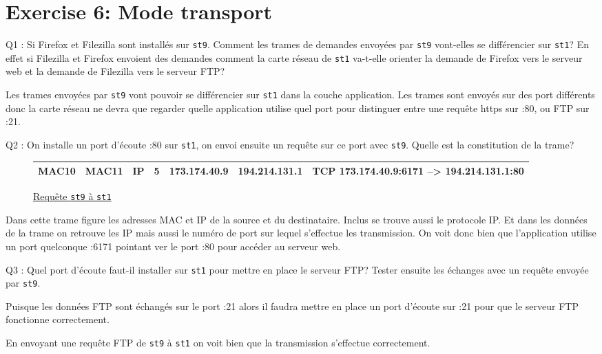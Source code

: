 \documentclass[11pt, openright]{book}
\begin{document}
\section{Exercise 6: Mode transport}

\begin{dent}{Q1 :} Si Firefox et Filezilla sont installés sur \texttt{st9}. Comment les trames de demandes envoyées par \texttt{st9} vont-elles se différencier sur \texttt{st1}? En effet si Filezilla et Firefox envoient des demandes comment la carte réseau de \texttt{st1} va-t-elle orienter la demande de Firefox vers le serveur web et la demande de Filezilla vers le serveur FTP?
	
	Les trames envoyées par \texttt{st9} vont pouvoir se différencier sur \texttt{st1} dans la couche application. Les trames sont envoyés sur des port différents donc la carte réseau ne devra que regarder quelle application utilise quel port pour distinguer entre une requête https sur :80, ou FTP sur :21. 
	
\end{dent}

\begin{dent}{Q2 :} On installe un port d'écoute :80 sur \texttt{st1}, on envoi ensuite un requête sur ce port avec \texttt{st9}. Quelle est la constitution de la trame?
	
	\begin{figure}[ht!]
		\centering
		\begin{tabular}{|c|c|c|c|l|l|l}
			\hline
			MAC10 & MAC11 & IP & 5 & 173.174.40.9 & 194.214.131.1 & TCP 173.174.40.9:6171 --> 194.214.131.1:80 \\
			\hline
		\end{tabular}
		\caption{\ul{Requête \texttt{st9} à \texttt{st1}}}
	\end{figure}
	
	Dans cette trame figure les adresses MAC et IP de la source et du destinataire. Inclus se trouve aussi le protocole IP. Et dans les données de la trame on retrouve les IP mais aussi le numéro de port sur lequel s'effectue les transmission. On voit donc bien que l'application utilise un port quelconque :6171 pointant ver le port :80 pour accéder au serveur web. 
	
\end{dent}

\begin{dent}{Q3 :} Quel port d'écoute faut-il installer sur \texttt{st1} pour mettre en place le serveur FTP? Tester ensuite les échanges avec un requête envoyée par \texttt{st9}.
	
	Puisque les données FTP sont échangés sur le port :21 alors il faudra mettre en place un port d'écoute sur :21 pour que le serveur FTP fonctionne correctement.
	
	En envoyant une requête FTP de \texttt{st9} à \texttt{st1} on voit bien que la transmission s'effectue correctement.
	
\end{dent}
\end{document}
